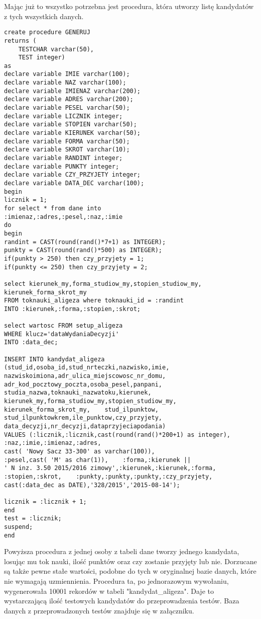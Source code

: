 Mając już to wszystko potrzebna jest procedura, która utworzy listę kandydatów z tych wszystkich danych. 

\begin{verbatim}
create procedure GENERUJ
returns (
    TESTCHAR varchar(50),
    TEST integer)
as
declare variable IMIE varchar(100);
declare variable NAZ varchar(100);
declare variable IMIENAZ varchar(200);
declare variable ADRES varchar(200);
declare variable PESEL varchar(50);
declare variable LICZNIK integer;
declare variable STOPIEN varchar(50);
declare variable KIERUNEK varchar(50);
declare variable FORMA varchar(50);
declare variable SKROT varchar(10);
declare variable RANDINT integer;
declare variable PUNKTY integer;
declare variable CZY_PRZYJETY integer;
declare variable DATA_DEC varchar(100);
begin
licznik = 1;
for select * from dane into
:imienaz,:adres,:pesel,:naz,:imie
do
begin
randint = CAST(round(rand()*7+1) as INTEGER);
punkty = CAST(round(rand()*500) as INTEGER);
if(punkty > 250) then czy_przyjety = 1;
if(punkty <= 250) then czy_przyjety = 2;

select kierunek_my,forma_studiow_my,stopien_studiow_my,
kierunek_forma_skrot_my
FROM toknauki_aligeza where toknauki_id = :randint
INTO :kierunek,:forma,:stopien,:skrot;

select wartosc FROM setup_aligeza 
WHERE klucz='dataWydaniaDecyzji'
INTO :data_dec;

INSERT INTO kandydat_aligeza
(stud_id,osoba_id,stud_nrteczki,nazwisko,imie,
nazwiskoimiona,adr_ulica_miejscowosc_nr_domu,
adr_kod_pocztowy_poczta,osoba_pesel,panpani,
studia_nazwa,toknauki_nazwatoku,kierunek,
kierunek_my,forma_studiow_my,stopien_studiow_my,
kierunek_forma_skrot_my,    stud_ilpunktow,
stud_ilpunktowkrem,ile_punktow,czy_przyjety,
data_decyzji,nr_decyzji,dataprzyjeciapodania)
VALUES (:licznik,:licznik,cast(round(rand()*200+1) as integer),
:naz,:imie,:imienaz,:adres, 
cast( 'Nowy Sacz 33-300' as varchar(100)),
:pesel,cast( 'M' as char(1)),    :forma,:kierunek || 
' N inz. 3.50 2015/2016 zimowy',:kierunek,:kierunek,:forma,
:stopien,:skrot,    :punkty,:punkty,:punkty,:czy_przyjety,
cast(:data_dec as DATE),'328/2015','2015-08-14');

licznik = :licznik + 1;
end
test = :licznik;
suspend;
end
\end{verbatim}
Powyższa procedura z jednej osoby z tabeli dane tworzy jednego kandydata, losując mu tok nauki, ilość punktów oraz czy zostanie przyjęty lub nie. Dorzucane są także pewne stałe wartości, podobne do tych w oryginalnej bazie danych, które nie wymagają uzmiennienia. Procedura ta, po jednorazowym wywołaniu, wygenerowała 10001 rekordów w tabeli "kandydat\_aligeza". Daje to wystarczającą ilość testowych kandydatów do przeprowadzenia testów. Baza danych z przeprowadzonych testów znajduje się w załączniku.

